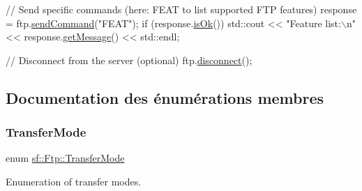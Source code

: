 \begin{DoxyCode}
\textcolor{comment}{// Send specific commands (here: FEAT to list supported FTP features)}
response = ftp.\hyperlink{classsf_1_1Ftp_a44e095103ecbce175a33eaf0820440ff}{sendCommand}(\textcolor{stringliteral}{"FEAT"});
\textcolor{keywordflow}{if} (response.\hyperlink{classsf_1_1Ftp_1_1Response_a5102552955a2652c1a39e9046e617b36}{isOk}())
    std::cout << \textcolor{stringliteral}{"Feature list:\(\backslash\)n"} << response.\hyperlink{classsf_1_1Ftp_1_1Response_a4af82a0b3620c90558390e1f600abc05}{getMessage}() << std::endl;

\textcolor{comment}{// Disconnect from the server (optional)}
ftp.\hyperlink{classsf_1_1Ftp_acf7459926f3391cd06bf84337ed6a0f4}{disconnect}();
\end{DoxyCode}
 

\subsection{Documentation des énumérations membres}
\mbox{\label{classsf_1_1Ftp_a1cd6b89ad23253f6d97e6d4ca4d558cb}} 
\subsubsection{\texorpdfstring{Transfer\+Mode}{TransferMode}}
{\footnotesize\ttfamily enum \hyperlink{classsf_1_1Ftp_a1cd6b89ad23253f6d97e6d4ca4d558cb}{sf\+::\+Ftp\+::\+Transfer\+Mode}}



Enumeration of transfer modes. 

